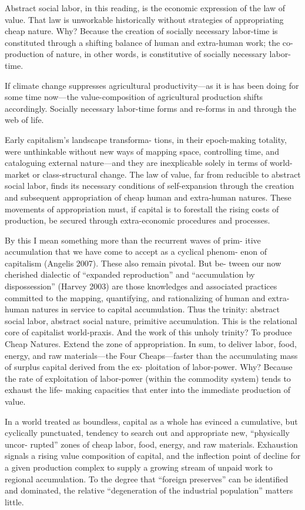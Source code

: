 \documentclass[
]{book}
\begin{document}
Abstract social labor, in this reading, is the economic expression of
the law of value. That law is unworkable historically without strategies
of appropriating cheap nature. Why? Because the creation of socially
necessary labor-time is constituted through a shifting balance of
human and extra-human work; the co-production of nature, in other words,
is constitutive of socially necessary labor-time.

If climate change suppresses agricultural productivity---as it is has been doing for some
time now---the value-composition of agricultural production shifts
accordingly. Socially necessary labor-time forms and re-forms in and
through the web of life.

Early capitalism's landscape transforma-
tions, in their epoch-making totality, were unthinkable without new
ways of mapping space, controlling time, and cataloguing external
nature---and they are inexplicable solely in terms of world-market or
class-structural change. The law of value, far from reducible to
abstract social labor, finds its necessary conditions of self-expansion
through the creation and subsequent appropriation of cheap human
and extra-human natures. These movements of appropriation must,
if capital is to forestall the rising costs of production, be secured
through extra-economic procedures and processes.

By this I mean something more than the recurrent waves of prim-
itive accumulation that we have come to accept as a cyclical phenom-
enon of capitalism (Angelis 2007). These also remain pivotal. But be-
tween our now cherished dialectic of ``expanded reproduction'' and
``accumulation by dispossession'' (Harvey 2003) are those knowledges
and associated practices committed to the mapping, quantifying, and
rationalizing of human and extra-human natures in service to capital
accumulation. Thus the trinity: abstract social labor, abstract social
nature, primitive accumulation. This is the relational core of capitalist
world-praxis. And the work of this unholy trinity? To produce
Cheap Natures. Extend the zone of appropriation. In sum, to deliver
labor, food, energy, and raw materials---the Four Cheaps---faster
than the accumulating mass of surplus capital derived from the ex-
ploitation of labor-power. Why? Because the rate of exploitation of
labor-power (within the commodity system) tends to exhaust the life-
making capacities that enter into the immediate production of value.

In a world treated as boundless, capital
as a whole has evinced a cumulative, but cyclically punctuated,
tendency to search out and appropriate new, ``physically uncor-
rupted'' zones of cheap labor, food, energy, and raw materials.
Exhaustion signals a rising value composition of capital, and the
inflection point of decline for a given production complex to supply a
growing stream of unpaid work to regional accumulation.
To the
degree that ``foreign preserves'' can be identified and dominated, the
relative ``degeneration of the industrial population'' matters little.
\end{document}
